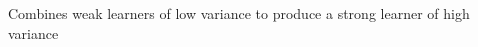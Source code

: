 \documentclass[preview]{standalone}
\begin{document}
\begin{center}
Combines weak learners of low variance to produce a strong learner of high variance
\end{center}
\end{document}
